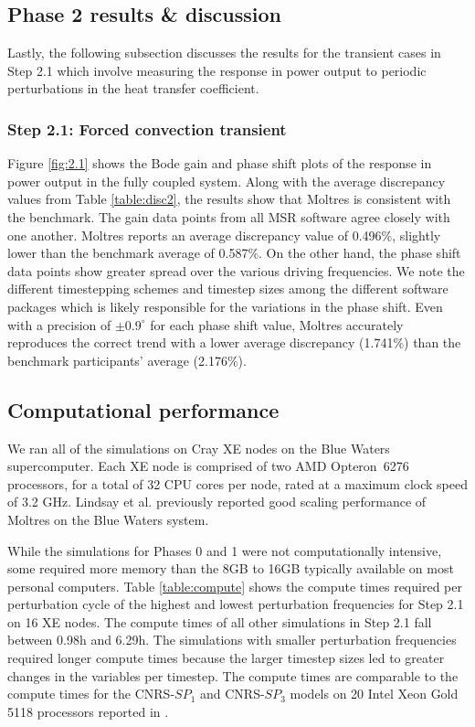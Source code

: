 \subsection{Phase 2 results \& discussion}

Lastly, the following subsection discusses the results for the transient cases
in Step 2.1 which involve measuring the response in power output to periodic
perturbations in the heat transfer coefficient.

\subsubsection{Step 2.1: Forced convection transient}

Figure \ref{fig:2.1} shows the Bode gain and phase shift plots of the response
in power output in the fully coupled system. Along with the average discrepancy
values from Table \ref{table:disc2}, the results show that Moltres is
consistent with the benchmark. The gain data points from all \gls{MSR} software
agree closely with one another. Moltres reports an average discrepancy value of
0.496\%, slightly lower than the benchmark average of 0.587\%. On the other
hand, the phase shift data points show greater spread over the various driving
frequencies. We note the different timestepping schemes and timestep
sizes among the different software packages which is likely responsible for
the variations in the phase shift. Even with a precision of
$\pm0.9^\circ$ for each phase shift value, Moltres accurately reproduces the
correct trend with a lower average discrepancy (1.741\%) than the benchmark
participants' average (2.176\%).

\subsection{Computational performance}

We ran all of the simulations on Cray XE nodes on the Blue Waters
supercomputer. Each XE node is comprised of two AMD Opteron\texttrademark\ 6276
processors, for a total of 32 CPU cores per node, rated at a maximum clock
speed of 3.2 GHz. Lindsay et al. \cite{lindsay_introduction_2018} previously
reported good scaling performance of Moltres on the Blue Waters system.

While the simulations for Phases 0 and 1 were not computationally intensive,
some required more memory than the 8GB to 16GB typically available on most
personal computers. Table \ref{table:compute} shows the compute times required
per perturbation cycle of the highest and lowest perturbation frequencies for
Step 2.1 on 16 XE nodes. The compute times of all other simulations in Step 2.1
fall between 0.98h and 6.29h. The simulations with smaller perturbation
frequencies required longer compute times because the larger timestep sizes led
to greater changes in the variables per timestep. The compute times are
comparable to the compute times for the CNRS-$SP_1$ and CNRS-$SP_3$ models on
20 Intel\textsuperscript{\tiny\textregistered}
Xeon\textsuperscript{\tiny\textregistered} Gold 5118 processors reported in
\cite{blanco_neutronic_2021,blanco_neutronic_2020}.

